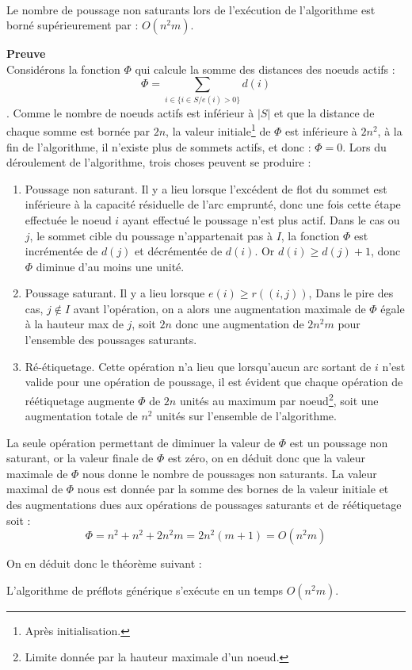 \begin{lemma}~\\
	\label{borne_pns}
	Le nombre de poussage non saturants lors de l'exécution de l'algorithme est borné supérieurement
	par : $O(n^2m)$.
\end{lemma}

\textbf{Preuve}\\
Considérons la fonction $\Phi$ qui calcule la somme des distances des noeuds actifs : $$
\Phi = \sum_{i \in \{i \in S / e(i) > 0\}} d(i)$$. Comme le nombre de noeuds actifs est inférieur à
$|S|$ et que la distance de chaque somme est bornée par $2n$, la valeur initiale\footnote{Après
initialisation.} de $\Phi$ est inférieure à $2n^2$, à la fin de l'algorithme, il n'existe plus de
sommets actifs, et donc : $\Phi = 0$.
Lors du déroulement de l'algorithme, trois choses peuvent se produire : \begin{enumerate}
	\item Poussage non saturant. Il y a lieu lorsque l'excédent de flot du sommet est inférieure à la
		capacité résiduelle de l'arc emprunté, donc une fois cette étape effectuée le noeud $i$ ayant
		effectué le poussage n'est plus actif. Dans le cas ou $j$, le sommet cible du poussage
		n'appartenait pas à $I$, la fonction $\Phi$ est incrémentée de $d(j)$ et décrémentée de $d(i)$.
		Or $d(i) \geq d(j) + 1$, donc $\Phi$ diminue d'au moins une unité.
	\item Poussage saturant. Il y a lieu lorsque $e(i) \geq r((i,j))$, Dans le pire des cas, $j \not
		\in I$ avant l'opération, on a alors une augmentation maximale de $\Phi$ égale à la hauteur max
		de $j$, soit $2n$ donc une augmentation de $2n^2m$ pour l'ensemble des poussages saturants.
	\item Ré-étiquetage. Cette opération n'a lieu que lorsqu'aucun arc sortant de $i$ n'est valide
		pour une opération de poussage, il est évident que chaque opération de réétiquetage augmente
		$\Phi$ de $2n$ unités au maximum par noeud\footnote{Limite donnée par la hauteur maximale d'un
		noeud.}, soit une augmentation totale de $n^2$ unités sur l'ensemble de l'algorithme.
\end{enumerate}

La seule opération permettant de diminuer la valeur de $\Phi$ est un poussage non saturant, or la
valeur finale de $\Phi$ est zéro, on en déduit donc que la valeur maximale de $\Phi$ nous donne le
nombre de poussages non saturants. La valeur maximal de $\Phi$ nous est donnée par la somme des
bornes de la valeur initiale et des augmentations dues aux opérations de poussages saturants et de
réétiquetage soit : $$
\Phi = n^2 + n^2 + 2n^2m = 2n^2 (m + 1) = O(n^2m) $$

On en déduit donc le théorème suivant :
\begin{thrm}
	L'algorithme de préflots générique s'exécute en un temps $O(n^2m)$.
\end{thrm}


